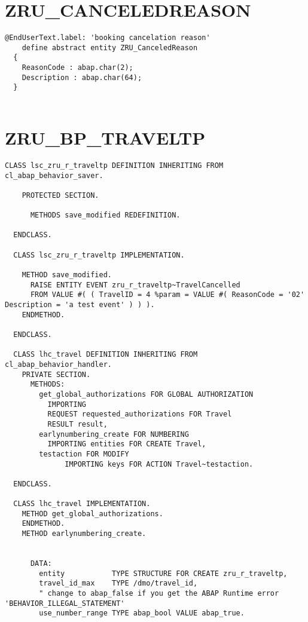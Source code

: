 \section*{ ZRU\_CANCELEDREASON } 

\begin{Verbatim}[breaklines=true]
    @EndUserText.label: 'booking cancelation reason'
    define abstract entity ZRU_CanceledReason 
  {
    ReasonCode : abap.char(2);  
    Description : abap.char(64);
  }
  
\end{Verbatim}


\section*{ ZRU\_BP\_TRAVELTP } 

\begin{Verbatim}[breaklines=true]
    CLASS lsc_zru_r_traveltp DEFINITION INHERITING FROM cl_abap_behavior_saver.

    PROTECTED SECTION.
  
      METHODS save_modified REDEFINITION.
  
  ENDCLASS.
  
  CLASS lsc_zru_r_traveltp IMPLEMENTATION.
  
    METHOD save_modified.
      RAISE ENTITY EVENT zru_r_traveltp~TravelCancelled
      FROM VALUE #( ( TravelID = 4 %param = VALUE #( ReasonCode = '02' Description = 'a test event' ) ) ).
    ENDMETHOD.
  
  ENDCLASS.
  
  CLASS lhc_travel DEFINITION INHERITING FROM cl_abap_behavior_handler.
    PRIVATE SECTION.
      METHODS:
        get_global_authorizations FOR GLOBAL AUTHORIZATION
          IMPORTING
          REQUEST requested_authorizations FOR Travel
          RESULT result,
        earlynumbering_create FOR NUMBERING
          IMPORTING entities FOR CREATE Travel,
        testaction FOR MODIFY
              IMPORTING keys FOR ACTION Travel~testaction.
  
  ENDCLASS.
  
  CLASS lhc_travel IMPLEMENTATION.
    METHOD get_global_authorizations.
    ENDMETHOD.
    METHOD earlynumbering_create.
  
  
      DATA:
        entity           TYPE STRUCTURE FOR CREATE zru_r_traveltp,
        travel_id_max    TYPE /dmo/travel_id,
        " change to abap_false if you get the ABAP Runtime error 'BEHAVIOR_ILLEGAL_STATEMENT'
        use_number_range TYPE abap_bool VALUE abap_true.
  

\end{Verbatim}
